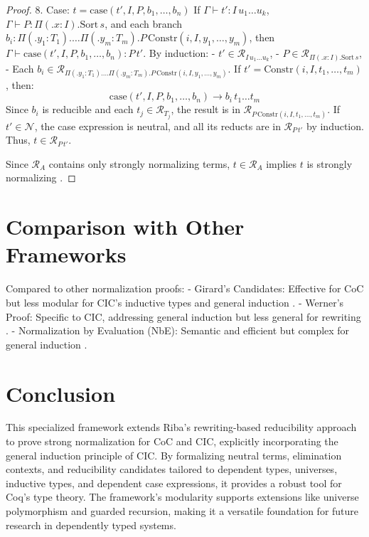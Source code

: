 \documentclass{article}
\theoremstyle{plain}
\theoremstyle{definition}
\newcommand{\ctx}{\Gamma}
\newcommand{\reduct}{\mathcal{R}}
\newcommand{\neut}{\mathcal{N}}
\newcommand{\fib}[2]{\Pi #1 . #2}
\newcommand{\app}[2]{#1 \, #2}
\newcommand{\rewrite}{\to}
\newcommand{\constr}{\text{Constr}}
\newcommand{\case}{\text{case}}
\begin{document}
\begin{proof}[Proof]
8. Case: \(t = \case(t', I, P, b_1, \dots, b_n)\)
   If \(\ctx \vdash t' : I \, u_1 \dots u_k\),
      \(\ctx \vdash P : \fib (x : I). \text{Sort} \, s\),
   and each branch \(b_i : \fib (y_1 : T_1). \dots \fib (y_m : T_m).
   \app{P}{\constr(i, I, y_1, \dots, y_m)}\),
   then \(\ctx \vdash \case(t', I, P, b_1, \dots, b_n) : \app{P}{t'}\).
   By induction:
   - \(t' \in \reduct_{I \, u_1 \dots u_k}\),
   - \(P \in \reduct_{\fib (x : I). \text{Sort} \, s}\),
   - Each \(b_i \in \reduct_{\fib (y_1 : T_1). \dots \fib (y_m : T_m).
     \app{P}{\constr(i, I, y_1, \dots, y_m)}}\).
   If \(t' = \constr(i, I, t_1, \dots, t_m)\), then:
   \[
   \case(t', I, P, b_1, \dots, b_n) \rewrite \app{b_i}{t_1} \dots t_m
   \]
   Since \(b_i\) is reducible and each \(t_j \in \reduct_{T_j}\),
   the result is in \(\reduct_{\app{P}{\constr(i, I, t_1, \dots, t_m)}}\).
   If \(t' \in \neut\), the case expression is neutral,
   and all its reducts are in \(\reduct_{\app{P}{t'}}\) by induction.
   Thus, \(t \in \reduct_{\app{P}{t'}}\).

Since \(\reduct_A\) contains only strongly normalizing terms,
\(t \in \reduct_A\) implies \(t\) is strongly normalizing \cite{riba2008, werner1994}.
\end{proof}

\newpage

\section{Comparison with Other Frameworks}

Compared to other normalization proofs:
- Girard’s Candidates: Effective for CoC but less modular for CIC’s
  inductive types and general induction \cite{girard1972}.
- Werner’s Proof: Specific to CIC, addressing general induction
  but less general for rewriting \cite{werner1994}.
- Normalization by Evaluation (NbE): Semantic and efficient but
  complex for general induction \cite{abel2012}.

\section{Conclusion}

This specialized framework extends Riba’s rewriting-based reducibility approach
to prove strong normalization for CoC and CIC, explicitly incorporating the general
induction principle of CIC. By formalizing neutral terms, elimination contexts,
and reducibility candidates tailored to dependent types, universes, inductive types,
and dependent case expressions, it provides a robust tool for Coq’s type theory.
The framework’s modularity supports extensions like universe polymorphism and guarded recursion,
making it a versatile foundation for future research in dependently typed systems.
\end{document}
